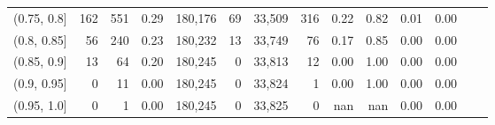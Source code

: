 \begin{tabular}{rrrrrrrrrrrrrr}
(0.75, 0.8]    &     162 &    551 &   0.29 &  180,176 &       69 &  33,509 &     316 &  0.22 &  0.82 &  0.01 &      0.00 \\
(0.8, 0.85]    &      56 &    240 &   0.23 &  180,232 &       13 &  33,749 &      76 &  0.17 &  0.85 &  0.00 &      0.00 \\
(0.85, 0.9]    &      13 &     64 &   0.20 &  180,245 &        0 &  33,813 &      12 &  0.00 &  1.00 &  0.00 &      0.00 \\
(0.9, 0.95]    &       0 &     11 &   0.00 &  180,245 &        0 &  33,824 &       1 &  0.00 &  1.00 &  0.00 &      0.00 \\
(0.95, 1.0]    &       0 &      1 &   0.00 &  180,245 &        0 &  33,825 &       0 &   nan &   nan &  0.00 &      0.00 \\
\bottomrule
\end{tabular}
